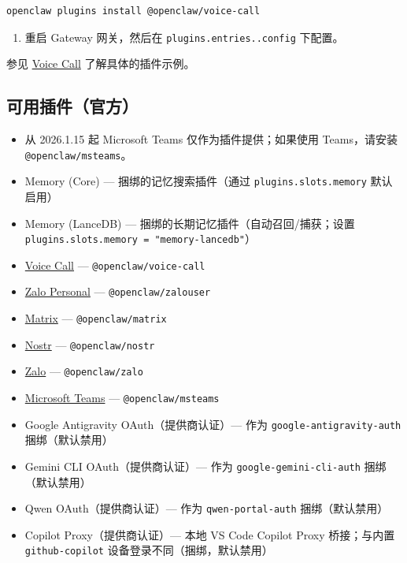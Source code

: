 \begin{lstlisting}[language=bash]
openclaw plugins install @openclaw/voice-call
\end{lstlisting}


\begin{enumerate}
  \item 重启 Gateway 网关，然后在 \texttt{plugins.entries..config} 下配置。
\end{enumerate}


参见 \href{/plugins/voice-call}{Voice Call} 了解具体的插件示例。

\subsection{可用插件（官方）}


\begin{itemize}
  \item 从 2026.1.15 起 Microsoft Teams 仅作为插件提供；如果使用 Teams，请安装 \texttt{@openclaw/msteams}。
  \item Memory (Core) — 捆绑的记忆搜索插件（通过 \texttt{plugins.slots.memory} 默认启用）
  \item Memory (LanceDB) — 捆绑的长期记忆插件（自动召回/捕获；设置 \texttt{plugins.slots.memory = "memory-lancedb"}）
  \item \href{/plugins/voice-call}{Voice Call} — \texttt{@openclaw/voice-call}
  \item \href{/plugins/zalouser}{Zalo Personal} — \texttt{@openclaw/zalouser}
  \item \href{/channels/matrix}{Matrix} — \texttt{@openclaw/matrix}
  \item \href{/channels/nostr}{Nostr} — \texttt{@openclaw/nostr}
  \item \href{/channels/zalo}{Zalo} — \texttt{@openclaw/zalo}
  \item \href{/channels/msteams}{Microsoft Teams} — \texttt{@openclaw/msteams}
  \item Google Antigravity OAuth（提供商认证）— 作为 \texttt{google-antigravity-auth} 捆绑（默认禁用）
  \item Gemini CLI OAuth（提供商认证）— 作为 \texttt{google-gemini-cli-auth} 捆绑（默认禁用）
  \item Qwen OAuth（提供商认证）— 作为 \texttt{qwen-portal-auth} 捆绑（默认禁用）
  \item Copilot Proxy（提供商认证）— 本地 VS Code Copilot Proxy 桥接；与内置 \texttt{github-copilot} 设备登录不同（捆绑，默认禁用）
\end{itemize}


